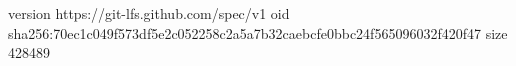 version https://git-lfs.github.com/spec/v1
oid sha256:70ec1c049f573df5e2c052258c2a5a7b32caebcfe0bbc24f565096032f420f47
size 428489

